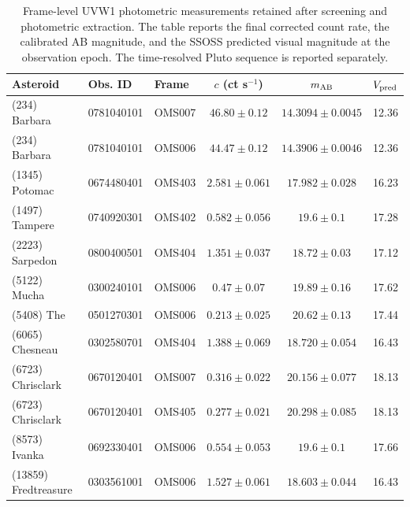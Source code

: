 \begin{table}[t]
\centering
\small
\setlength{\tabcolsep}{3pt}
\renewcommand{\arraystretch}{1.03}
\begin{tabular}{lllccc}
\toprule
Asteroid & Obs. ID & Frame & $c$ (ct s$^{-1}$) & $m_{\rm AB}$ & $V_{\rm pred}$ \\
\midrule
(234) Barbara & 0781040101 & OMS007 & $46.80 \pm 0.12$ & $14.3094 \pm 0.0045$ & 12.36 \\
(234) Barbara & 0781040101 & OMS006 & $44.47 \pm 0.12$ & $14.3906 \pm 0.0046$ & 12.36 \\
(1345) Potomac & 0674480401 & OMS403 & $2.581 \pm 0.061$ & $17.982 \pm 0.028$ & 16.23 \\
(1497) Tampere & 0740920301 & OMS402 & $0.582 \pm 0.056$ & $19.6 \pm 0.1$ & 17.28 \\
(2223) Sarpedon & 0800400501 & OMS404 & $1.351 \pm 0.037$ & $18.72 \pm 0.03$ & 17.12 \\
(5122) Mucha & 0300240101 & OMS006 & $0.47 \pm 0.07$ & $19.89 \pm 0.16$ & 17.62 \\
(5408) The & 0501270301 & OMS006 & $0.213 \pm 0.025$ & $20.62 \pm 0.13$ & 17.44 \\
(6065) Chesneau & 0302580701 & OMS404 & $1.388 \pm 0.069$ & $18.720 \pm 0.054$ & 16.43 \\
(6723) Chrisclark & 0670120401 & OMS007 & $0.316 \pm 0.022$ & $20.156 \pm 0.077$ & 18.13 \\
(6723) Chrisclark & 0670120401 & OMS405 & $0.277 \pm 0.021$ & $20.298 \pm 0.085$ & 18.13 \\
(8573) Ivanka & 0692330401 & OMS006 & $0.554 \pm 0.053$ & $19.6 \pm 0.1$ & 17.66 \\
(13859) Fredtreasure & 0303561001 & OMS006 & $1.527 \pm 0.061$ & $18.603 \pm 0.044$ & 16.43 \\
\bottomrule
\end{tabular}
\caption{Frame-level UVW1 photometric measurements retained after screening and photometric extraction. The table reports the final corrected count rate, the calibrated AB magnitude, and the SSOSS predicted visual magnitude at the observation epoch. The time-resolved Pluto sequence is reported separately.}
\label{tab:photometry_output}
\end{table}